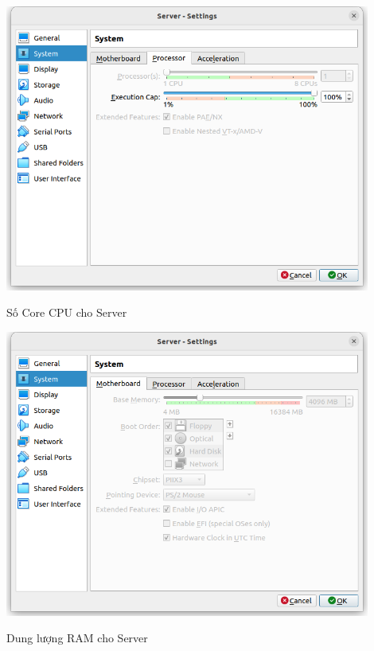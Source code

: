\documentclass[a4paper, 11pt]{article}
\begin{document}
\begin{itemize}
\begin{enumerate}
                    \begin{minipage}
                        {\linewidth}
                        \captionsetup{type=figure}
                        \centering
                        \includegraphics[width=12cm]{images/server-processor.png}
                        \caption{Số Core CPU cho Server}
                        \label{figure:server-processor}
                    \end{minipage}

                    \begin{minipage}{\linewidth}
                        \captionsetup{type=figure}
                        \centering
                        \includegraphics[width=12cm]{images/server-ram.png}
                        \caption{Dung lượng RAM cho Server}
                        \label{figure:server-ram}
                    \end{minipage}


\end{enumerate}
\end{itemize}
\end{document}

